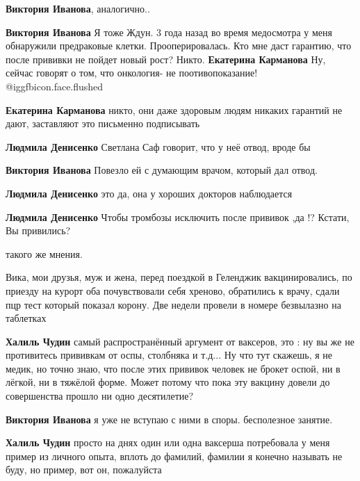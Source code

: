 \begin{itemize}
\begin{itemize}
\textbf{Виктория Иванова}, аналогично..

\textbf{Виктория Иванова} Я тоже Ждун. 3 года назад во время медосмотра у меня обнаружили предраковые клетки. Прооперировалась. Кто мне даст гарантию, что после прививки не пойдет новый рост? Никто.
\textbf{Екатерина Карманова} Ну, сейчас говорят о том, что онкология- не поотивопоказание!  @igg{fbicon.face.flushed} 

\textbf{Екатерина Карманова} никто, они даже здоровым людям никаких гарантий не дают, заставляют это письменно подписывать

\textbf{Людмила Денисенко} Светлана Саф говорит, что у неё отвод, вроде бы

\textbf{Виктория Иванова} Повезло ей с думающим врачом, который дал отвод.

\textbf{Людмила Денисенко} это да, она у хороших докторов наблюдается

\textbf{Людмила Денисенко} Чтобы тромбозы исключить после прививок ,да !? Кстати, Вы привились?

\end{itemize} %

такого же мнения.


Вика, мои друзья, муж и жена, перед поездкой в Геленджик вакцинировались, по
приезду на курорт оба почувствовали себя хреново, обратились к врачу, сдали пцр
тест который показал корону. Две недели провели в номере безвылазно на
таблетках

\begin{itemize} %
\textbf{Халиль Чудин} самый распространённый аргумент от ваксеров, это : ну вы же не противитесь прививкам от оспы, столбняка и т.д... Ну что тут скажешь, я не медик, но точно знаю, что после этих прививок человек не брокет оспой, ни в лёгкой, ни в тяжёлой форме. Может потому что пока эту вакцину довели до совершенства прошло ни одно десятилетие?

\textbf{Виктория Иванова} я уже не вступаю с ними в споры. бесполезное занятие.

\textbf{Халиль Чудин} просто на днях один или одна ваксерша потребовала у меня пример из личного опыта, вплоть до фамилий, фамилии я конечно называть не буду, но пример, вот он, пожалуйста


\end{itemize}
\end{itemize}
